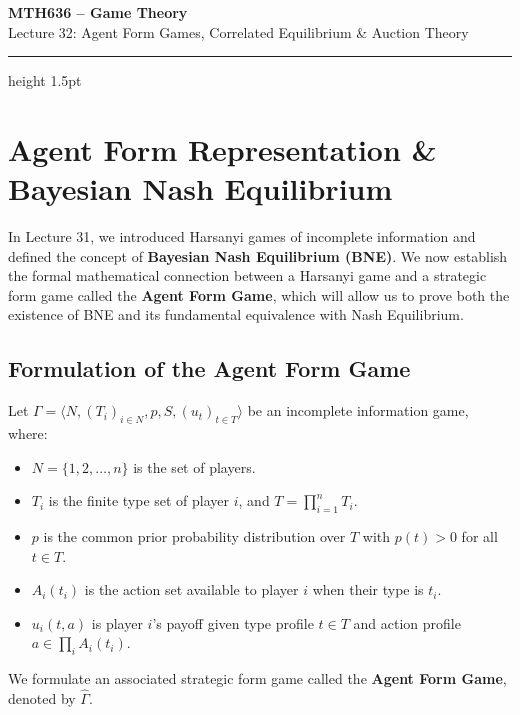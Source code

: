 \documentclass[12pt, a4paper]{article}
\begin{document}
\begin{center}
  {\LARGE\bfseries\sffamily\color{defblue} MTH636 -- Game Theory}\\[6pt]
  {\Large\sffamily Lecture 32: Agent Form Games, Correlated Equilibrium \& Auction Theory}\\[4pt]
\end{center}
\vspace{0.5cm}
\hrule height 1.5pt
\vspace{0.3cm}

\section{Agent Form Representation \& Bayesian Nash Equilibrium}

In Lecture 31, we introduced Harsanyi games of incomplete information and defined the concept of \textbf{Bayesian Nash Equilibrium (BNE)}. We now establish the formal mathematical connection between a Harsanyi game and a strategic form game called the \textbf{Agent Form Game}, which will allow us to prove both the existence of BNE and its fundamental equivalence with Nash Equilibrium.

\subsection{Formulation of the Agent Form Game}

Let $\Gamma = \langle N, (T_i)_{i \in N}, p, S, (u_t)_{t \in T} \rangle$ be an incomplete information game, where:
\begin{itemize}
    \item $N = \{1, 2, \dots, n\}$ is the set of players.
    \item $T_i$ is the finite type set of player $i$, and $T = \prod_{i=1}^n T_i$.
    \item $p$ is the common prior probability distribution over $T$ with $p(t) > 0$ for all $t \in T$.
    \item $A_i(t_i)$ is the action set available to player $i$ when their type is $t_i$.
    \item $u_i(t, a)$ is player $i$'s payoff given type profile $t \in T$ and action profile $a \in \prod_i A_i(t_i)$.
\end{itemize}

We formulate an associated strategic form game called the \textbf{Agent Form Game}, denoted by $\hat{\Gamma}$.
\end{document}
